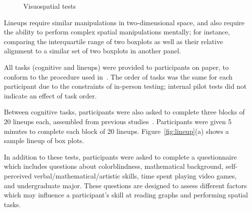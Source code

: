 \documentclass[journal]{vgtc}\usepackage[]{graphicx}\usepackage[]{color}
\begin{document}
\begin{figure}[ht]
  \centering
\hfill
    \hfill
    \caption{Visuospatial tests}
    \label{fig:tests}
\end{figure}

Lineups require similar manipulations in two-dimensional space, and also require the ability to perform complex spatial manipulations mentally; for instance, comparing the interquartile range of two boxplots as well as their relative alignment to a similar set of two boxplots in another panel.

All tasks (cognitive and lineups) were provided to participants on paper, to conform to the procedure used in~\cite{ekstrom1976manual}. The order of tasks was the same for each participant due to the constraints of in-person testing; internal pilot tests did not indicate an effect of task order.

Between cognitive tasks, participants were also asked to complete three blocks of 20 lineups each, assembled from previous studies~\cite{hofmann2012graphical,majumder2013validation}. Participants were given 5 minutes to complete each block of 20 lineups. Figure~\ref{fig:lineup}(a) shows a sample lineup of box plots. 

In addition to these tests, participants were asked to complete a questionnaire which includes questions about colorblindness, mathematical background, self-perceived verbal/mathematical/artistic skills, time spent playing video games, and undergraduate major. These questions are designed to assess different factors which may influence a participant's skill at reading graphs and performing spatial tasks. 
\end{document}
